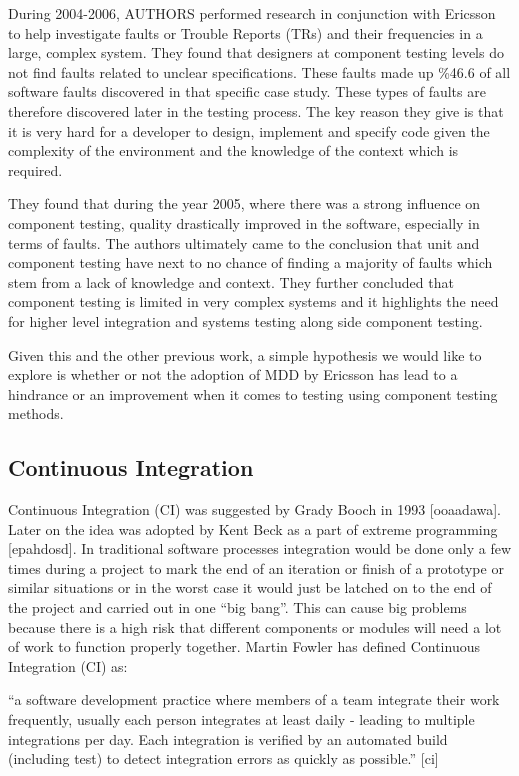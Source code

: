 \documentclass[fina_report_innit.tex]{subfiles}
\begin{document}
During 2004-2006, AUTHORS performed research in conjunction with Ericsson to help investigate faults or Trouble Reports (TRs) and their frequencies in a large, complex system. They found that designers at component testing levels do not find faults related to unclear specifications. These faults made up \%46.6 of all software faults discovered in that specific case study. These types of faults are therefore discovered later in the testing process. The key reason they give is that it is very hard for a developer to design, implement and specify code given the complexity of the environment and the knowledge of the context which is required. 

They found that during the year 2005, where there was a strong influence on component testing, quality drastically improved in the software, especially in terms of faults. The authors ultimately came to the conclusion that unit and component testing have next to no chance of finding a majority of faults which stem from a lack of knowledge and context. They further concluded that component testing is limited in very complex systems and it highlights the need for higher level integration and systems testing along side component testing.

Given this and the other previous work, a simple hypothesis we would like to explore is whether or not the adoption of MDD by Ericsson has lead to a hindrance or an improvement when it comes to testing using component testing methods.

\subsection*{Continuous Integration}
Continuous Integration (CI) was suggested by Grady Booch in 1993 [ooaadawa]. Later on the idea was adopted by Kent Beck as a part of extreme programming [epahdosd]. In traditional software processes integration would be done only a few times during a project to mark the end of an iteration or finish of a prototype or similar situations or in the worst case it would just be latched on to the end of the project and carried out in one “big bang”. This can cause big problems because there is a high risk that different components or modules will need a lot of work to function properly together. Martin Fowler has defined Continuous Integration (CI) as: 

“a software development practice where members of a team  integrate  their  work  frequently,  usually  each person  integrates  at  least  daily  -  leading  to  multiple integrations per day. Each integration is verified by an automated build (including test) to detect integration errors as quickly as possible.” [ci]
\end{document}
